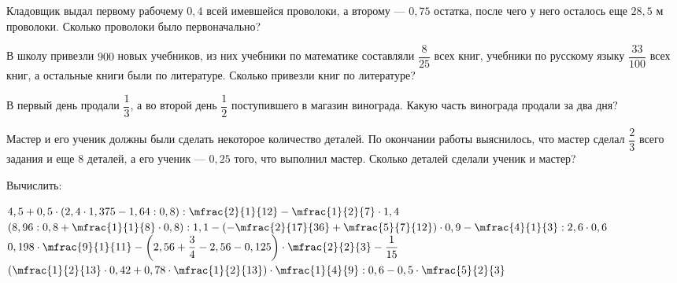 \begin{homework}[number=3]
	\begin{listofex}
		\item Кладовщик выдал первому рабочему \(0,4\) всей имевшейся проволоки, а второму --- \(0,75\) остатка, после чего у него осталось еще \(28,5\) м проволоки. Сколько проволоки было первоначально?
		\item В школу привезли \(900\) новых учебников, из них учебники по математике составляли \(\dfrac{8}{25}\) всех книг, учебники по русскому языку \(\dfrac{33}{100}\) всех книг, а остальные книги были по литературе. Сколько привезли книг по литературе?
		\item В первый день продали \(\dfrac{1}{3}\), а во второй день \(\dfrac{1}{2}\) поступившего в магазин винограда. Какую часть винограда продали за два дня?
		\item Мастер и его ученик должны были сделать некоторое количество деталей. По окончании работы выяснилось, что мастер сделал \(\dfrac{2}{3}\) всего задания и еще \(8\) деталей, а его ученик --- \(0,25\) того, что выполнил мастер. Сколько деталей сделали ученик и мастер?
		\item Вычислить:
		\begin{itasks}[1]
			\task \( 4,5 + 0,5 \cdot (2,4 \cdot 1,375 - 1,64 : 0,8) : \mfrac{2}{1}{12} - \mfrac{1}{2}{7} \cdot 1,4 \)
			\task \( \left(  8,96 : 0,8 + \mfrac{1}{1}{8} \cdot 0,8 \right) : 1,1 - \left( - \mfrac{2}{17}{36} + \mfrac{5}{7}{12} \right) \cdot 0,9 - \mfrac{4}{1}{3} : 2,6 \cdot 0,6 \)
			\task \( 0,198 \cdot \mfrac{9}{1}{11} - \left(  2,56 + \dfrac{3}{4} - 2,56 - 0,125 \right) \cdot \mfrac{2}{2}{3} - \dfrac{1}{15} \)
			\task \( \left( \mfrac{1}{2}{13} \cdot 0,42 + 0,78 \cdot \mfrac{1}{2}{13} \right) \cdot \mfrac{1}{4}{9} : 0,6 - 0,5 \cdot \mfrac{5}{2}{3} \)
		\end{itasks}
	\end{listofex}
\end{homework}

